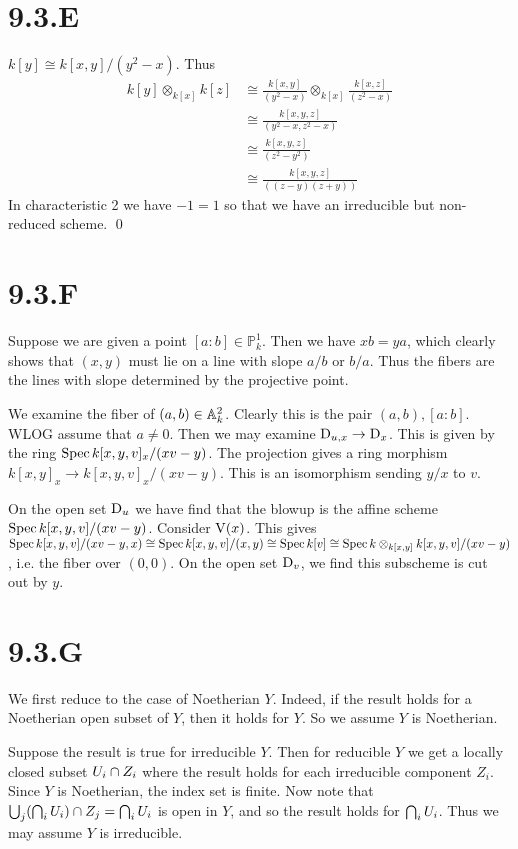 \documentclass{article}
\begin{document}
\section{9.3.E}
$k[y] \cong k[x, y]/(y^2-x)$. Thus
\begin{align*}
    k[y] \otimes_{k[x]} k[z] & \cong \frac{k[x,y]}{(y^2-x)} \otimes_{k[x]} \frac{k[x,z]}{(z^2-x)} \\
                             & \cong \frac{k[x,y,z]}{(y^2-x, z^2-x)}                              \\
                             & \cong \frac{k[x,y,z]}{(z^2-y^2)}                                   \\
                             & \cong \frac{k[x,y,z]}{((z-y)(z+y))}
\end{align*}
In characteristic 2 we have $-1=1$ so that we have an
irreducible but non-reduced scheme. \qed

\section{9.3.F}
Suppose we are given a point $[a : b] \in \mathbb{P}^1_k$. Then we have
$xb=ya$, which clearly shows that $(x, y)$ must
lie on a line with slope $a/b$ or $b/a$.
Thus the fibers are the lines with slope determined by the projective point.

We examine the fiber of $(a, b) \in \mathbb{A}^2_k$. Clearly this is the pair
$(a,b), [a : b]$. WLOG assume that $a \neq 0$. Then we may
examine $\operatorname{D}_{u, x} \to \operatorname{D}_x$. This is given by the ring
$\operatorname{Spec} k[x, y, v]_x/(xv-y)$. The projection gives a ring morphism
$k[x, y]_x \to k[x, y, v]_x/(xv-y)$. This is an isomorphism sending $y/x$
to $v$.

On the open set $\operatorname{D}_u$ we have find that the blowup is the
affine scheme $\operatorname{Spec} k[x, y, v]/(xv-y)$. Consider $\operatorname{V}(x)$. This
gives $\operatorname{Spec} k[x, y, v]/(xv-y,x) \cong \operatorname{Spec}
    k[x, y, v]/(x, y) \cong \operatorname{Spec}
    k[v] \cong \operatorname{Spec} k \otimes_{k[x, y]}
    k[x,y,v]/(xv-y)$, i.e. the fiber over $(0, 0)$. On
the open set $\operatorname{D}_v$, we find this subscheme is cut out by
$y$.

\section{9.3.G}
We first reduce to the case of Noetherian $Y$. Indeed, if
the result holds for a Noetherian open subset of $Y$, then
it holds for $Y$. So we assume $Y$ is
Noetherian.

Suppose the result is true for irreducible $Y$. Then for
reducible $Y$ we get a locally closed subset
$U_i \cap Z_i$ where the result holds for each irreducible component
$Z_i$. Since $Y$ is Noetherian, the index
set is finite. Now note that $\bigcup_j (\bigcap_i U_i) \cap Z_j = \bigcap_i U_i$ is open in
$Y$, and so the result holds for $\bigcap_i U_i$.
Thus we may assume $Y$ is irreducible.
\end{document}
